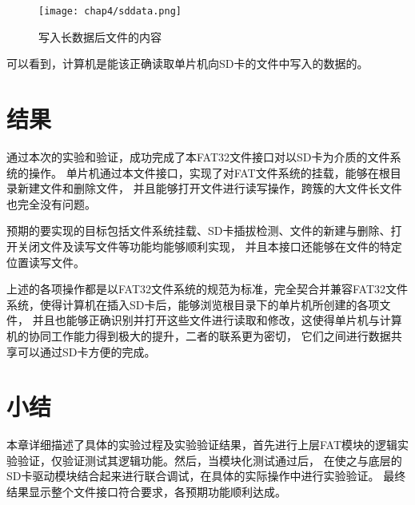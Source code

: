 \begin{figure}[!htbp]
    \centering
    \texttt{[image: chap4/sddata.png]}
    \\
    \caption{写入长数据后文件的内容} \label{fig:sddata}
\end{figure}

可以看到，计算机是能该正确读取单片机向SD卡的文件中写入的数据的。

\section{结果}
\label{sec:Conclusion}
通过本次的实验和验证，成功完成了本FAT32文件接口对以SD卡为介质的文件系统的操作。
单片机通过本文件接口，实现了对FAT文件系统的挂载，能够在根目录新建文件和删除文件，
并且能够打开文件进行读写操作，跨簇的大文件长文件也完全没有问题。

预期的要实现的目标包括文件系统挂载、SD卡插拔检测、文件的新建与删除、打开关闭文件及读写文件等功能均能够顺利实现，
并且本接口还能够在文件的特定位置读写文件。

上述的各项操作都是以FAT32文件系统的规范为标准，完全契合并兼容FAT32文件系统，使得计算机在插入SD卡后，能够浏览根目录下的单片机所创建的各项文件，
并且也能够正确识别并打开这些文件进行读取和修改，这使得单片机与计算机的协同工作能力得到极大的提升，二者的联系更为密切，
它们之间进行数据共享可以通过SD卡方便的完成。

\section{小结}
\label{sec:Sum4}
本章详细描述了具体的实验过程及实验验证结果，首先进行上层FAT模块的逻辑实验验证，仅验证测试其逻辑功能。然后，当模块化测试通过后，
在使之与底层的SD卡驱动模块结合起来进行联合调试，在具体的实际操作中进行实验验证。
最终结果显示整个文件接口符合要求，各预期功能顺利达成。
